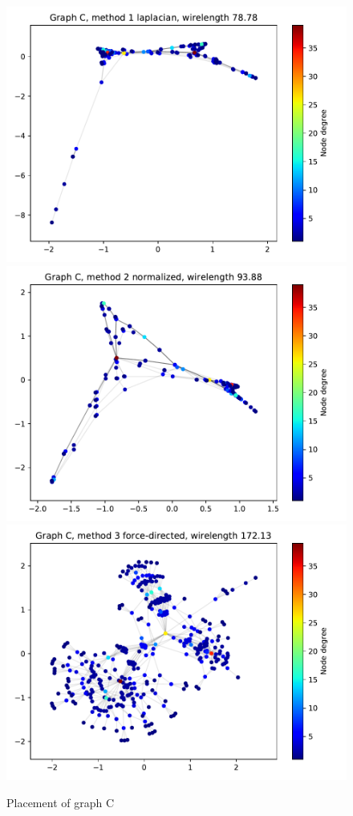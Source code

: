 \documentclass[a4paper,twocolumn]{article}
\begin{document}
\begin{figure}[h]
	\centering
	\includegraphics[width=\columnwidth]{fig/C/laplacian.pdf}
	\includegraphics[width=\columnwidth]{fig/C/norm.pdf}
	\includegraphics[width=\columnwidth]{fig/C/spring.pdf}
	\caption{Placement of graph C}
	\label{fig:graphC}
\end{figure}
\end{document}
